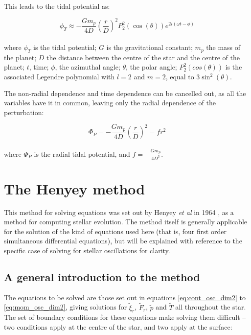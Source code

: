 \documentclass[11pt]{amsart}
\begin{document}
This leads to the tidal potential as:

\begin{equation} \label{eq:tidal_full}
\phi_{T} \approx - \frac{G m_{p}}{4 D}  \left( \frac{r}{D} \right)^{2}  P_{2}^{2} (\cos (\theta)) e^{2 i (\omega t - \phi)} 
\end{equation}
\\
where $\phi_{T}$ is the tidal potential; $G$ is the gravitational constant; $m_{p}$ the mass of the planet; $D$ the distance between the centre of the star and the centre of the planet; $t$, time; $\phi$, the azimuthal angle; $\theta$, the polar angle; $P_{2}^{2}(cos(\theta))$ is the associated Legendre polynomial with $l=2$ and $m=2$, equal to $3 \sin^{2}(\theta)$.

The non-radial dependence and time dependence can be cancelled out, as all the variables have it in common, leaving only the radial dependence of the perturbation:

\begin{equation}
\Phi_{P} = - \frac{G m_{p}}{4 D}  \left( \frac{r}{D} \right)^{2}  = f r^{2}
\end{equation}
\\
where $\Phi_{P}$ is the radial tidal potential, and $f = - \frac{G m_{p}}{4 D^{3}}$.














\section{The Henyey method}   \label{Henyey}

This method for solving equations was set out by Henyey \textit{et al} in 1964 \cite{Henyey1964}, as a method for computing stellar evolution. The method itself is generally applicable for the solution of the kind of equations used here (that is, four first order simultaneous differential equations), but will be explained with reference to the specific case of solving for stellar oscillations for clarity.

\subsection{A general introduction to the method}  \label{Henyey:General}

The equations to be solved are those set out in equations \ref{eq:cont_osc_dim2} to \ref{eq:mom_osc_dim2}, giving solutions for $\tilde{\xi}_{r}$, $\tilde{F}_{r}$, $\tilde{p}$ and $\tilde{T}$ all throughout the star.  The set of boundary conditions for these equations make solving them difficult -- two conditions apply at the centre of the star, and two apply at the surface:
\end{document}
